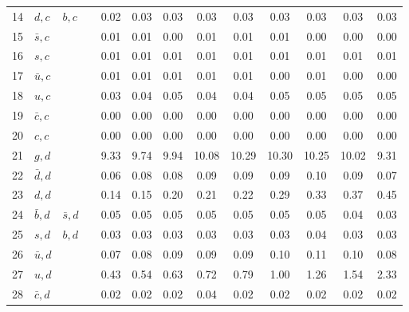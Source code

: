 \begin{tabularx}{\textwidth}{rXXX@{}S@{}S@{}S@{}S@{}S@{}S@{}S@{}S@{}S}
 14 & $d, c$           & $b, c$            &                  &  0.02 &  0.03 &  0.03 &  0.03 &  0.03 &  0.03 &  0.03 &  0.03 &  0.03 \\
 15 & $\bar s, c$      &                   &                  &  0.01 &  0.01 &  0.00 &  0.01 &  0.01 &  0.01 &  0.00 &  0.00 &  0.00 \\
 16 & $s, c$           &                   &                  &  0.01 &  0.01 &  0.01 &  0.01 &  0.01 &  0.01 &  0.01 &  0.01 &  0.01 \\
 17 & $\bar u, c$      &                   &                  &  0.01 &  0.01 &  0.01 &  0.01 &  0.01 &  0.00 &  0.01 &  0.00 &  0.00 \\
 18 & $u, c$           &                   &                  &  0.03 &  0.04 &  0.05 &  0.04 &  0.04 &  0.05 &  0.05 &  0.05 &  0.05 \\
 19 & $\bar c, c$      &                   &                  &  0.00 &  0.00 &  0.00 &  0.00 &  0.00 &  0.00 &  0.00 &  0.00 &  0.00 \\
 20 & $c, c$           &                   &                  &  0.00 &  0.00 &  0.00 &  0.00 &  0.00 &  0.00 &  0.00 &  0.00 &  0.00 \\
 21 & $g, d$           &                   &                  &  9.33 &  9.74 &  9.94 & 10.08 & 10.29 & 10.30 & 10.25 & 10.02 &  9.31 \\
 22 & $\bar d, d$      &                   &                  &  0.06 &  0.08 &  0.08 &  0.09 &  0.09 &  0.09 &  0.10 &  0.09 &  0.07 \\
 23 & $d, d$           &                   &                  &  0.14 &  0.15 &  0.20 &  0.21 &  0.22 &  0.29 &  0.33 &  0.37 &  0.45 \\
 24 & $\bar b, d$      & $\bar s, d$       &                  &  0.05 &  0.05 &  0.05 &  0.05 &  0.05 &  0.05 &  0.05 &  0.04 &  0.03 \\
 25 & $s, d$           & $b, d$            &                  &  0.03 &  0.03 &  0.03 &  0.03 &  0.03 &  0.03 &  0.04 &  0.03 &  0.03 \\
 26 & $\bar u, d$      &                   &                  &  0.07 &  0.08 &  0.09 &  0.09 &  0.09 &  0.10 &  0.11 &  0.10 &  0.08 \\
 27 & $u, d$           &                   &                  &  0.43 &  0.54 &  0.63 &  0.72 &  0.79 &  1.00 &  1.26 &  1.54 &  2.33 \\
 28 & $\bar c, d$      &                   &                  &  0.02 &  0.02 &  0.02 &  0.04 &  0.02 &  0.02 &  0.02 &  0.02 &  0.02 \\

\end{tabularx}
